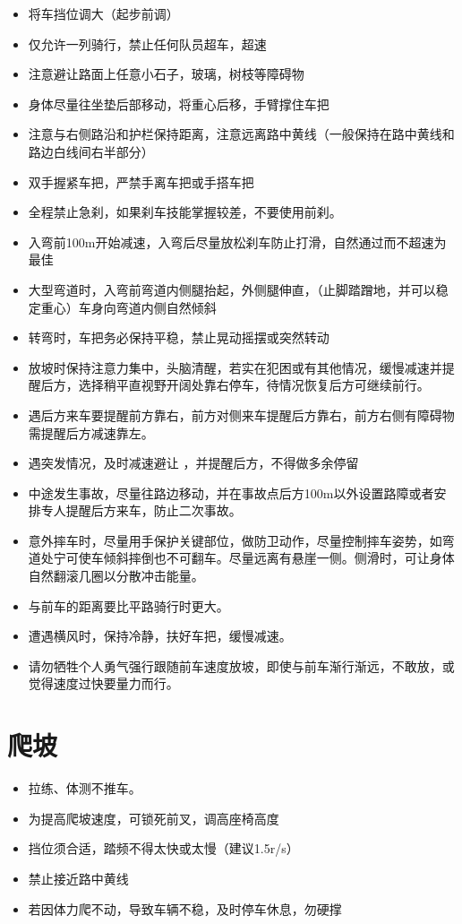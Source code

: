 \documentclass{ctexbook}
\begin{document}
\begin{itemize}
    \item 将车挡位调大（起步前调）
    \item 仅允许一列骑行，禁止任何队员超车，超速
    \item 注意避让路面上任意小石子，玻璃，树枝等障碍物
    \item 身体尽量往坐垫后部移动，将重心后移，手臂撑住车把
    \item 注意与右侧路沿和护栏保持距离，注意远离路中黄线（一般保持在路中黄线和路边白线间右半部分）
    \item 双手握紧车把，严禁手离车把或手搭车把
    \item 全程禁止急刹，如果刹车技能掌握较差，不要使用前刹。
    \item 入弯前100m开始减速，入弯后尽量放松刹车防止打滑，自然通过而不超速为最佳
    \item 大型弯道时，入弯前弯道内侧腿抬起，外侧腿伸直，（止脚踏蹭地，并可以稳定重心）车身向弯道内侧自然倾斜
    \item 转弯时，车把务必保持平稳，禁止晃动摇摆或突然转动
    \item 放坡时保持注意力集中，头脑清醒，若实在犯困或有其他情况，缓慢减速并提醒后方，选择稍平直视野开阔处靠右停车，待情况恢复后方可继续前行。
    \item 遇后方来车要提醒前方靠右，前方对侧来车提醒后方靠右，前方右侧有障碍物需提醒后方减速靠左。
    \item 遇突发情况，及时减速避让 ，并提醒后方，不得做多余停留   
    \item 中途发生事故，尽量往路边移动，并在事故点后方100m以外设置路障或者安排专人提醒后方来车，防止二次事故。
    \item 意外摔车时，尽量用手保护关键部位，做防卫动作，尽量控制摔车姿势，如弯道处宁可使车倾斜摔倒也不可翻车。尽量远离有悬崖一侧。侧滑时，可让身体自然翻滚几圈以分散冲击能量。
    \item 与前车的距离要比平路骑行时更大。
    \item 遭遇横风时，保持冷静，扶好车把，缓慢减速。
    \item 请勿牺牲个人勇气强行跟随前车速度放坡，即使与前车渐行渐远，不敢放，或觉得速度过快要量力而行。
\end{itemize}
\section{爬坡}
\begin{itemize}
    \item 拉练、体测不推车。

    \item 为提高爬坡速度，可锁死前叉，调高座椅高度
    
    \item 挡位须合适，踏频不得太快或太慢（建议1.5r/s）

    \item 禁止接近路中黄线

    \item 若因体力爬不动，导致车辆不稳，及时停车休息，勿硬撑
\end{itemize}
\end{document}
